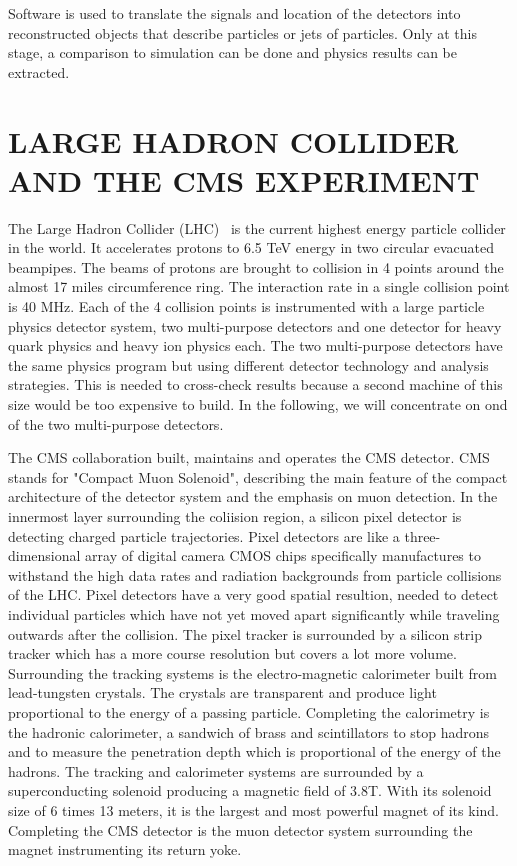 \documentclass{wscpaperproc}
\theoremstyle{wsc}
\begin{document}
Software is used to translate the signals and location of the detectors into reconstructed objects that describe particles or jets of particles. Only at this stage, a comparison to simulation can be done and physics results can be extracted.

\section{LARGE HADRON COLLIDER AND THE CMS EXPERIMENT}
\label{sec:lhc}

The Large Hadron Collider (LHC)~\cite{1748-0221-3-08-S08001} is the current highest energy particle collider in the world. It accelerates protons to 6.5 TeV energy in two circular evacuated beampipes. The beams of protons are brought to collision in 4 points around the almost 17 miles circumference ring. The interaction rate in a single collision point is 40 MHz. Each of the 4 collision points is instrumented with a large particle physics detector system, two multi-purpose detectors and one detector for heavy quark physics and heavy ion physics each. The two multi-purpose detectors have the same physics program but using different detector technology and analysis strategies. This is needed to cross-check results because a second machine of this size would be too expensive to build. In the following, we will concentrate on ond of the two multi-purpose detectors.

The CMS collaboration built, maintains and operates the CMS detector. CMS stands for "Compact Muon Solenoid", describing the main feature of the compact architecture of the detector system and the emphasis on muon detection. In the innermost layer surrounding the coliision region, a silicon pixel detector is detecting charged particle trajectories. Pixel detectors are like a three-dimensional array of digital camera CMOS chips specifically manufactures to withstand the high data rates and radiation backgrounds from particle collisions of the LHC. Pixel detectors have a very good spatial resultion, needed to detect individual particles which have not yet moved apart significantly while traveling outwards after the collision. The pixel tracker is surrounded by a silicon strip tracker which has a more course resolution but covers a lot more volume. Surrounding the tracking systems is the electro-magnetic calorimeter built from lead-tungsten crystals. The crystals are transparent and produce light proportional to the energy of a passing particle. Completing the calorimetry is the hadronic calorimeter, a sandwich of brass and scintillators to stop hadrons and to measure the penetration depth which is proportional of the energy of the hadrons. The tracking and calorimeter systems are surrounded by a superconducting solenoid producing a magnetic field of 3.8T. With its solenoid size of 6 times 13 meters, it is the largest and most powerful magnet of its kind. Completing the CMS detector is the muon detector system surrounding the magnet instrumenting its return yoke. 
\end{document}
